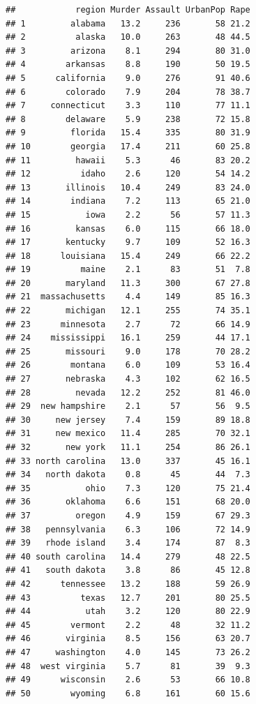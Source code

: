 \documentclass[
]{article}
\begin{document}
\begin{verbatim}
##            region Murder Assault UrbanPop Rape
## 1         alabama   13.2     236       58 21.2
## 2          alaska   10.0     263       48 44.5
## 3         arizona    8.1     294       80 31.0
## 4        arkansas    8.8     190       50 19.5
## 5      california    9.0     276       91 40.6
## 6        colorado    7.9     204       78 38.7
## 7     connecticut    3.3     110       77 11.1
## 8        delaware    5.9     238       72 15.8
## 9         florida   15.4     335       80 31.9
## 10        georgia   17.4     211       60 25.8
## 11         hawaii    5.3      46       83 20.2
## 12          idaho    2.6     120       54 14.2
## 13       illinois   10.4     249       83 24.0
## 14        indiana    7.2     113       65 21.0
## 15           iowa    2.2      56       57 11.3
## 16         kansas    6.0     115       66 18.0
## 17       kentucky    9.7     109       52 16.3
## 18      louisiana   15.4     249       66 22.2
## 19          maine    2.1      83       51  7.8
## 20       maryland   11.3     300       67 27.8
## 21  massachusetts    4.4     149       85 16.3
## 22       michigan   12.1     255       74 35.1
## 23      minnesota    2.7      72       66 14.9
## 24    mississippi   16.1     259       44 17.1
## 25       missouri    9.0     178       70 28.2
## 26        montana    6.0     109       53 16.4
## 27       nebraska    4.3     102       62 16.5
## 28         nevada   12.2     252       81 46.0
## 29  new hampshire    2.1      57       56  9.5
## 30     new jersey    7.4     159       89 18.8
## 31     new mexico   11.4     285       70 32.1
## 32       new york   11.1     254       86 26.1
## 33 north carolina   13.0     337       45 16.1
## 34   north dakota    0.8      45       44  7.3
## 35           ohio    7.3     120       75 21.4
## 36       oklahoma    6.6     151       68 20.0
## 37         oregon    4.9     159       67 29.3
## 38   pennsylvania    6.3     106       72 14.9
## 39   rhode island    3.4     174       87  8.3
## 40 south carolina   14.4     279       48 22.5
## 41   south dakota    3.8      86       45 12.8
## 42      tennessee   13.2     188       59 26.9
## 43          texas   12.7     201       80 25.5
## 44           utah    3.2     120       80 22.9
## 45        vermont    2.2      48       32 11.2
## 46       virginia    8.5     156       63 20.7
## 47     washington    4.0     145       73 26.2
## 48  west virginia    5.7      81       39  9.3
## 49      wisconsin    2.6      53       66 10.8
## 50        wyoming    6.8     161       60 15.6
\end{verbatim}
\end{document}

